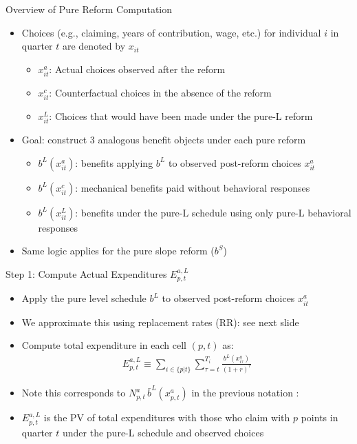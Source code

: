 \begin{frame}[label=pureDetails]{Overview of Pure Reform Computation}
\begin{itemize}
    \item Choices (e.g., claiming, years of contribution, wage, etc.) for individual $i$ in quarter $t$ are denoted by $x_{it}$
    \begin{itemize}
        \item $x^a_{it}$: Actual choices observed after the reform
        \item $x^c_{it}$: Counterfactual choices in the absence of the reform
        \item $x^L_{it}$: Choices that would have been made under the pure-L reform
    \end{itemize}
    \item Goal: construct 3 analogous benefit objects under each pure reform
    \begin{itemize}
        \item $b^{L}(x^a_{it})$: benefits applying $b^{L}$ to observed post-reform choices $x^a_{it}$
        \item $b^{L}(x^c_{it})$: mechanical benefits paid without behavioral responses
        \item $b^{L}(x^{L}_{it})$: benefits under the pure-L schedule using only pure-L behavioral responses
    \end{itemize}
    \item Same logic applies for the pure slope reform ($b^{S}$)
\end{itemize}
\end{frame}

\begin{frame}{Step 1: Compute Actual Expenditures $E^{a,L}_{p,t}$}
\begin{itemize}
    \item Apply the pure level schedule $b^{L}$ to observed post-reform choices $x^a_{it}$
    \item We approximate this using replacement rates (RR): see next slide

    \item {Compute total expenditure in each cell $(p,t)$ as:}
    \begin{align*}
        {E^{a,L}_{p,t} \equiv \sum_{i \in \{p|t\}} \sum_{\tau=t}^{T_i} \frac{b^L(x^a_{i\tau})}{(1+r)^{\tau}}}
    \end{align*}

    \item {Note this corresponds to $N^a_{p,t}\,\bar b^L(x^a_{p,t})$ in the previous notation :}

    \item {$E^{a,L}_{p,t}$ is the PV of total expenditures with those who claim with $p$ points in quarter $t$ under the pure-L schedule and observed choices}
\end{itemize}
\end{frame}

